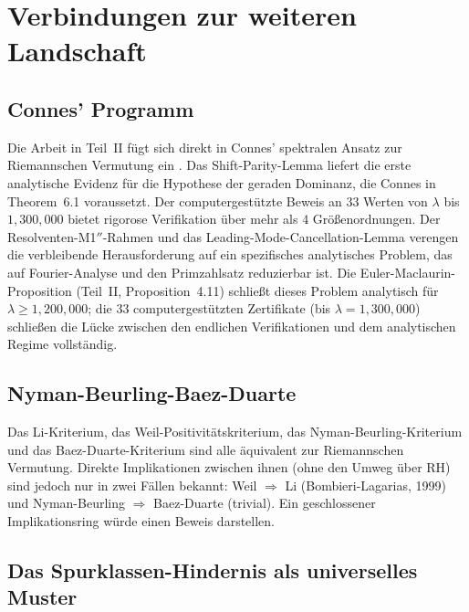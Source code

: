 \documentclass[12pt,a4paper]{article}
\theoremstyle{definition}
\theoremstyle{remark}
\begin{document}
\section{Verbindungen zur weiteren Landschaft}
\label{sec:connections}

\subsection{Connes' Programm}

Die Arbeit in Teil~II fügt sich direkt in Connes' spektralen Ansatz zur Riemannschen Vermutung ein \cite{Connes2026}. Das Shift-Parity-Lemma liefert die erste analytische Evidenz für die Hypothese der geraden Dominanz, die Connes in Theorem~6.1 voraussetzt. Der computergestützte Beweis an $33$ Werten von $\lambda$ bis $1{,}300{,}000$ bietet rigorose Verifikation über mehr als $4$ Größenordnungen. Der Resolventen-M1$''$-Rahmen und das Leading-Mode-Cancellation-Lemma verengen die verbleibende Herausforderung auf ein spezifisches analytisches Problem, das auf Fourier-Analyse und den Primzahlsatz reduzierbar ist. Die Euler-Maclaurin-Proposition (Teil~II, Proposition~4.11) schließt dieses Problem analytisch für $\lambda \geq 1{,}200{,}000$; die $33$ computergestützten Zertifikate (bis $\lambda = 1{,}300{,}000$) schließen die Lücke zwischen den endlichen Verifikationen und dem analytischen Regime vollständig.

\subsection{Nyman-Beurling-Baez-Duarte}

Das Li-Kriterium, das Weil-Positivitätskriterium, das Nyman-Beurling-Kriterium und das Baez-Duarte-Kriterium sind alle äquivalent zur Riemannschen Vermutung. Direkte Implikationen zwischen ihnen (ohne den Umweg über RH) sind jedoch nur in zwei Fällen bekannt: Weil $\Rightarrow$ Li (Bombieri-Lagarias, 1999) und Nyman-Beurling $\Rightarrow$ Baez-Duarte (trivial). Ein geschlossener Implikationsring würde einen Beweis darstellen.

\subsection{Das Spurklassen-Hindernis als universelles Muster}
\end{document}
